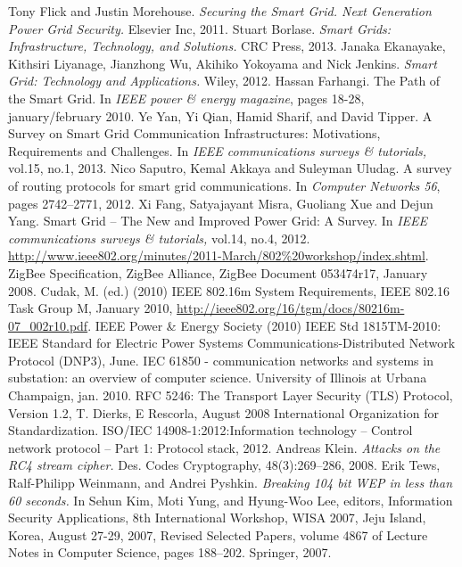\documentclass[11pt,oneside]{book}
\begin{document}
\begin{thebibliography}{99}
 Tony Flick and Justin Morehouse. \emph{Securing the Smart Grid. Next Generation Power Grid Security.} Elsevier Inc, 2011.
 Stuart Borlase. \emph{Smart Grids: Infrastructure, Technology, and Solutions.} CRC Press, 2013.
 Janaka Ekanayake, Kithsiri Liyanage, Jianzhong Wu, Akihiko Yokoyama and Nick Jenkins. \emph{Smart Grid: Technology and Applications.} Wiley, 2012.
 Hassan Farhangi. The Path of the Smart Grid. In \emph{IEEE power \& energy magazine}, pages 18-28, january/february 2010.
 Ye Yan, Yi Qian, Hamid Sharif, and David Tipper. A Survey on Smart Grid Communication Infrastructures: Motivations, Requirements and Challenges. In \emph{IEEE communications surveys \& tutorials,} vol.15, no.1, 2013.
 Nico Saputro, Kemal Akkaya and Suleyman Uludag. A survey of routing protocols for smart grid communications. In \emph{Computer Networks 56}, pages 2742–2771, 2012.
 Xi Fang, Satyajayant Misra, Guoliang Xue and Dejun Yang. Smart Grid – The New and Improved Power Grid: A Survey. In \emph{IEEE communications surveys \& tutorials,} vol.14, no.4, 2012.
 \url{http://www.ieee802.org/minutes/2011-March/802\%20workshop/index.shtml}.
 ZigBee Specification, ZigBee Alliance, ZigBee Document 053474r17, January 2008.
 Cudak, M. (ed.) (2010) IEEE 802.16m System Requirements, IEEE 802.16 Task Group M, January 2010, \url{http://ieee802.org/16/tgm/docs/80216m-07_002r10.pdf}.
 IEEE Power \& Energy Society (2010) IEEE Std 1815TM-2010: IEEE Standard for Electric Power Systems Communications-Distributed Network Protocol (DNP3), June.
 IEC 61850 - communication networks and systems in substation: an overview of computer science.
University of Illinois at Urbana Champaign, jan. 2010.
 RFC 5246: The Transport Layer Security (TLS) Protocol, Version 1.2, T. Dierks, E Rescorla, August 2008
 International Organization for Standardization. ISO/IEC 14908-1:2012:Information technology – Control network protocol – Part 1: Protocol stack, 2012.
 Andreas Klein. \emph{Attacks on the RC4 stream cipher.} Des. Codes Cryptography, 48(3):269–286, 2008.
 Erik Tews, Ralf-Philipp Weinmann, and Andrei Pyshkin. \emph{Breaking 104 bit WEP in less than 60 seconds.} In Sehun Kim, Moti Yung, and Hyung-Woo Lee, editors, Information Security Applications, 8th International Workshop, WISA 2007, Jeju Island, Korea, August 27-29, 2007, Revised Selected Papers, volume 4867 of Lecture Notes in Computer Science, pages 188–202. Springer, 2007.

\end{thebibliography}
\end{document}
